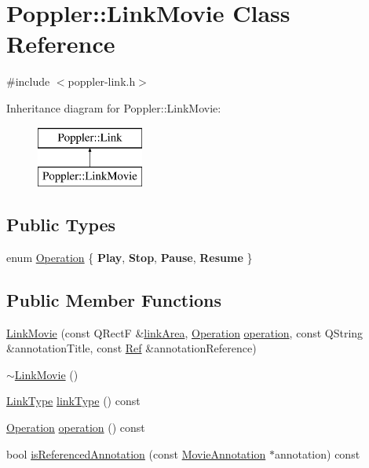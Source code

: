\hypertarget{class_poppler_1_1_link_movie}{}\section{Poppler\+:\+:Link\+Movie Class Reference}
\label{class_poppler_1_1_link_movie}


{\ttfamily \#include $<$poppler-\/link.\+h$>$}

Inheritance diagram for Poppler\+:\+:Link\+Movie\+:\begin{figure}[H]
\begin{center}
\leavevmode
\includegraphics[height=2.000000cm]{class_poppler_1_1_link_movie}
\end{center}
\end{figure}
\subsection*{Public Types}
\begin{DoxyCompactItemize}
\item 
enum \hyperlink{class_poppler_1_1_link_movie_a66b83ca2658b31b448e4b4696cb452ba}{Operation} \{ {\bfseries Play}, 
{\bfseries Stop}, 
{\bfseries Pause}, 
{\bfseries Resume}
 \}
\end{DoxyCompactItemize}
\subsection*{Public Member Functions}
\begin{DoxyCompactItemize}
\item 
\hyperlink{class_poppler_1_1_link_movie_a915e1ce81056878282c79f5068ddc562}{Link\+Movie} (const Q\+RectF \&\hyperlink{class_poppler_1_1_link_adb525b65cfac39dcdba3f59faa57a0bf}{link\+Area}, \hyperlink{class_poppler_1_1_link_movie_a66b83ca2658b31b448e4b4696cb452ba}{Operation} \hyperlink{class_poppler_1_1_link_movie_a38addd0e44a3f58b8fa8edf451a45830}{operation}, const Q\+String \&annotation\+Title, const \hyperlink{struct_ref}{Ref} \&annotation\+Reference)
\item 
\hyperlink{class_poppler_1_1_link_movie_a83a014c00f7abbfbdebca6cd7e25184c}{$\sim$\+Link\+Movie} ()
\item 
\hyperlink{class_poppler_1_1_link_af0dacfa77a548bb043dbae4bb9dc6c1e}{Link\+Type} \hyperlink{class_poppler_1_1_link_movie_a01b861d592530f64d3b35a2618ba21e6}{link\+Type} () const
\item 
\hyperlink{class_poppler_1_1_link_movie_a66b83ca2658b31b448e4b4696cb452ba}{Operation} \hyperlink{class_poppler_1_1_link_movie_a38addd0e44a3f58b8fa8edf451a45830}{operation} () const
\item 
bool \hyperlink{class_poppler_1_1_link_movie_afe90dc922934a62a0a176da914fbe629}{is\+Referenced\+Annotation} (const \hyperlink{class_poppler_1_1_movie_annotation}{Movie\+Annotation} $\ast$annotation) const
\end{DoxyCompactItemize}


